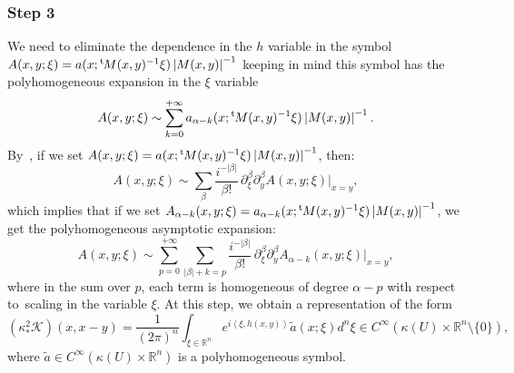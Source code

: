 \documentclass[JEP,XML,SOM,Unicode]{cedram}
\let\pazocal\mathscr
\theoremstyle{definition}
\let\cv\alpha
\let\asigma a
\newcommand{\module}[1]{\left|#1\right|}
\newcommand{\step}[1]{\subsubsection*{Step #1}}
\renewcommand{\t}{{{}^{\mathrm{t}\mkern-2mu}}}
\begin{document}
\step{3} We need to eliminate the dependence in the $h$ variable in the symbol $A(x,y;\xi)= \asigma(x; \t M(x,y)^{-1} \xi)\module{M(x,y)}^{-1}$
keeping in mind this symbol has the polyhomogeneous expansion in the $\xi$ variable
\[
A(x,y;\xi)\sim \sum_{k=0}^{+\infty}\asigma_{\cv-k}(x; \t M(x,y)^{-1} \xi)\module{M(x,y)}^{-1}.
\]
By~\cite[Th.\,3.1]{shubin}, if we set $A(x,y;\xi)=\asigma(x; \t M(x,y)^{-1}\xi)\module{M(x,y)}^{-1}$,
then:
\[
A(x,y;\xi)\sim {\sum_\beta} \frac{i^{-\vert \beta\vert}}{\beta !}\, \partial_\xi^\beta \partial_y^\beta A(x,y;\xi) |_{x=y},
\]
which implies that if we set $A_{\cv-k}(x,y;\xi)=\asigma_{\cv-k}(x; \t M(x,y)^{-1} \xi)\module{M(x,y)}^{-1}$, we get
the polyhomogeneous asymptotic expansion:
\begin{equation}\label{e:exp1referee}
A(x,y;\xi)\sim \sum_{p=0}^{+\infty} \sum_{\vert \beta\vert+k=p } \frac{i^{-\vert \beta\vert}}{\beta !}\, \partial_\xi^\beta \partial_y^\beta A_{\cv-k}(x,y;\xi) |_{x=y},
\end{equation}
where in the sum over $p$, each term is homogeneous of degree $\cv-p$ with respect to~scaling in the variable $\xi$.
At this step,
we obtain a representation of the form
\begin{equation*}%
{\left(\kappa^2_*\pazocal{K}\right)}(x,x-y)=\frac{1}{(2\pi)^n}\int_{\xi\in \mathbb{R}^n} e^{i\left\langle \xi,h(x,y)\right\rangle} \tilde{\asigma}(x; \xi) d^n\xi \in C^\infty(\kappa(U)\times \mathbb{R}^n\setminus\{0\}),
\end{equation*}
where $\tilde{\asigma}\in C^\infty(\kappa(U)\times \mathbb{R}^n)$ is a polyhomogeneous symbol.
\end{document}
